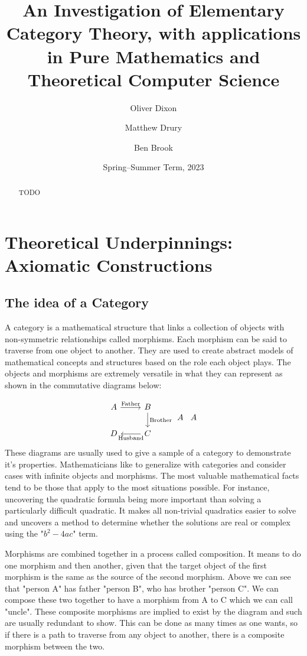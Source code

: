 \documentclass[10pt,a4paper]{amsart}
\title[An Investigation of Elementary Category Theory]{An Investigation of %
        Elementary Category Theory, with applications in Pure Mathematics and %
        Theoretical Computer Science}
\author{Oliver Dixon}  \email{\yorkemail{od641}}
\author{Matthew Drury} \email{\yorkemail{md1499}}
\author{Ben Brook}     \email{\yorkemail{bb1170}}
\date{Spring--Summer Term, 2023}
\begin{document}
\begin{abstract}
        TODO
\end{abstract}
\maketitle
\tableofcontents
\section{Theoretical %
        Underpinnings: Axiomatic Constructions}
\subsection{The idea of a Category}
A category is a mathematical structure that links a collection of objects with non-symmetric relationships called morphisms.
Each morphism can be said to traverse from one object to another.
They are used to create abstract models of mathematical concepts and structures based on the role each object plays.
The objects and morphisms are extremely versatile in what they can represent as shown in the commutative diagrams below:

\begin{equation}
\begin{tikzcd} 
        A \ar[r,"\text{Father}"] & B \ar[d,"\text{Brother}"]\\
        D & C \ar[l,"\text{Husband}"]
\end{tikzcd}
%
\begin{tikzcd}
A
\end{tikzcd}
%
\begin{tikzcd}
A
\end{tikzcd}
\end{equation}
These diagrams are usually used to give a sample of a category to demonstrate it's properties.
Mathematicians like to generalize with categories and consider cases with infinite objects and morphisms.
The most valuable mathematical facts tend to be those that apply to the most situations possible.
For instance, uncovering the quadratic formula being more important than solving a particularly difficult quadratic.
It makes all non-trivial quadratics easier to solve and uncovers a method to determine whether the solutions are real or complex using the "$b^2-4ac$" term.

Morphisms are combined together in a process called composition.
It means to do one morphism and then another, given that the target object of the first morphism is the same as the source of the second morphism.
Above we can see that "person A" has father "person B", who has brother "person C".
We can compose these two together to have a morphism from A to C which we can call "uncle".
These composite morphisms are implied to exist by the diagram and such are usually redundant to show.
This can be done as many times as one wants, so if there is a path to traverse from any object to another, there is a composite morphism between the two.
\end{document}

